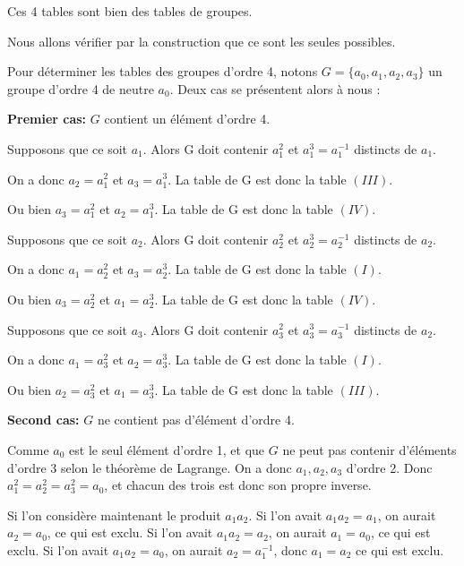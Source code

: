 \documentclass[titlepage]{article}
\begin{document}
    Ces 4 tables sont bien des tables de groupes.\newline

    Nous allons vérifier par la construction que ce sont les seules possibles.
    
    Pour déterminer les tables des groupes d'ordre 4, notons $G = \{a_0, a_1, a_2, a_3\}$ un groupe d'ordre 4 de neutre $a_0$.
    Deux cas se présentent alors à nous :\newline

    \textbf{Premier cas:} $G$ contient un élément d'ordre 4.\newline
    
    Supposons que ce soit $a_1$. Alors G doit contenir $a_1^2$ et $a_1^3 = a_1^{-1}$ distincts de $a_1$.
    
    On a donc $a_2 = a_1^2$ et $a_3 = a_1^3$. La table de G est donc la table $(III)$.
    
    Ou bien $a_3 = a_1^2$ et $a_2 = a_1^3$. La table de G est donc la table $(IV)$.\newline

    Supposons que ce soit $a_2$. Alors G doit contenir $a_2^2$ et $a_2^3 = a_2^{-1}$ distincts de $a_2$.
    
    On a donc $a_1 = a_2^2$ et $a_3 = a_2^3$. La table de G est donc la table $(I)$.
    
    Ou bien $a_3 = a_2^2$ et $a_1 = a_2^3$. La table de G est donc la table $(IV)$.\newline

    Supposons que ce soit $a_3$. Alors G doit contenir $a_3^2$ et $a_3^3 = a_3^{-1}$ distincts de $a_2$.
    
    On a donc $a_1 = a_3^2$ et $a_2 = a_3^3$. La table de G est donc la table $(I)$.
    
    Ou bien $a_2 = a_3^2$ et $a_1 = a_3^3$. La table de G est donc la table $(III)$.\newline

    \textbf{Second cas:} $G$ ne contient pas d'élément d'ordre 4. \newline
    
    Comme $a_0$ est le seul élément d'ordre 1, 
    et que $G$ ne peut pas contenir d'éléments d'ordre 3 selon le théorème de Lagrange. 
    On a donc $a_1, a_2, a_3$ d'ordre 2.
    Donc $a_1^2 = a_2^2 = a_3^2 = a_0$, et chacun des trois est donc son propre inverse.\newline
    
    Si l'on considère maintenant le produit $a_1a_2$. Si l'on avait $a_1a_2 = a_1$, on aurait $a_2 = a_0$, ce qui est exclu.
    Si l'on avait $a_1a_2 = a_2$, on aurait $a_1 = a_0$, ce qui est exclu. Si l'on avait $a_1a_2 = a_0$, on aurait $a_2 = a_1^{-1}$, donc $a_1 = a_2$ ce qui est exclu.\newline
    
\end{document}
